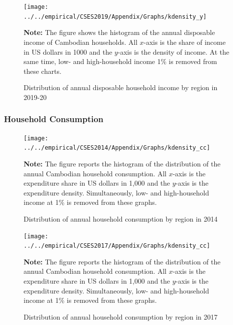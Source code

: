 \documentclass[11pt,letterpaper]{article}
\begin{document}
\begin{figure}
	\centering
	\caption{Distribution of annual disposable household income by region in 2019-20}
	\label{}
	\texttt{[image: ../../empirical/CSES2019/Appendix/Graphs/kdensity\_y]}
	\begin{tablenotes}
		\footnotesize
		\item \textbf{Note:} The figure shows the histogram of the annual disposable income of Cambodian households. All $x$-axis is the share of income in US dollars in 1000 and the $y$-axis is the density of income. At the same time, low- and high-household income 1\% is removed from these charts.
	\end{tablenotes} 
\end{figure}
\clearpage
\subsubsection{Household Consumption}
\begin{figure}[h!]
	\centering
	\caption{Distribution of annual household consumption by region in 2014}
	\label{}
	\texttt{[image: ../../empirical/CSES2014/Appendix/Graphs/kdensity\_cc]}
	\begin{tablenotes}
		\footnotesize
		\item \textbf{Note:} The figure reports the histogram of the distribution of the annual Cambodian household consumption. All $x$-axis is the expenditure share in US dollars in 1,000 and the $y$-axis is the expenditure density. Simultaneously, low- and high-household income at 1\% is removed from these graphs. 
	
	\end{tablenotes} 
\end{figure}

\begin{figure}
	\centering
	\caption{Distribution of annual household consumption by region in 2017}
	\label{}
	\texttt{[image: ../../empirical/CSES2017/Appendix/Graphs/kdensity\_cc]}
	\begin{tablenotes}
		\footnotesize
		\item \textbf{Note:} The figure reports the histogram of the distribution of the annual Cambodian household consumption. All $x$-axis is the expenditure share in US dollars in 1,000 and the $y$-axis is the expenditure density. Simultaneously, low- and high-household income at 1\% is removed from these graphs. 
	\end{tablenotes} 
\end{figure}
\end{document}
